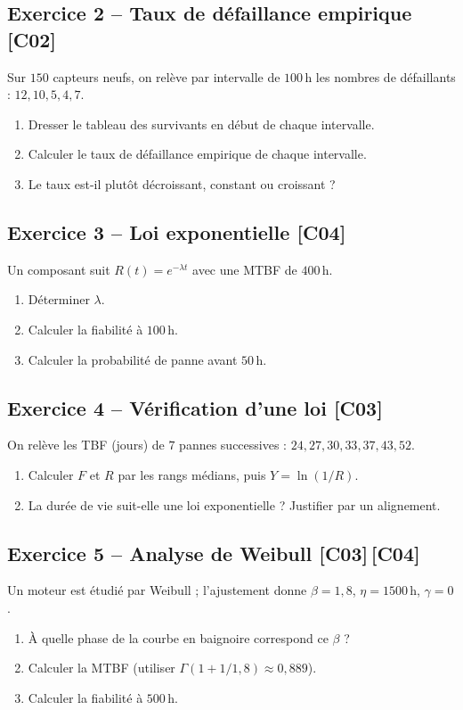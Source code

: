 \documentclass[a4paper,11pt]{article}
\begin{document}
\subsection*{Exercice 2 -- Taux de défaillance empirique \hfill {\normalsize\color{uimmred}[C02]}}
Sur $150$ capteurs neufs, on relève par intervalle de $100$\,h les nombres de défaillants : $12, 10, 5, 4, 7$.
\begin{enumerate}[label=\alph*)]
  \item Dresser le tableau des survivants en début de chaque intervalle.
  \item Calculer le taux de défaillance empirique de chaque intervalle.
  \item Le taux est-il plutôt décroissant, constant ou croissant ?
\end{enumerate}

\subsection*{Exercice 3 -- Loi exponentielle \hfill {\normalsize\color{uimmred}[C04]}}
Un composant suit $R(t) = e^{-\lambda t}$ avec une MTBF de $400$\,h.
\begin{enumerate}[label=\alph*)]
  \item Déterminer $\lambda$.
  \item Calculer la fiabilité à $100$\,h.
  \item Calculer la probabilité de panne avant $50$\,h.
\end{enumerate}

\subsection*{Exercice 4 -- Vérification d'une loi \hfill {\normalsize\color{uimmred}[C03]}}
On relève les TBF (jours) de $7$ pannes successives : $24, 27, 30, 33, 37, 43, 52$.
\begin{enumerate}[label=\alph*)]
  \item Calculer $F$ et $R$ par les rangs médians, puis $Y = \ln(1/R)$.
  \item La durée de vie suit-elle une loi exponentielle ? Justifier par un alignement.
\end{enumerate}

\subsection*{Exercice 5 -- Analyse de Weibull \hfill {\normalsize\color{uimmred}[C03]\,[C04]}}
Un moteur est étudié par Weibull ; l'ajustement donne $\beta = 1{,}8$, $\eta = 1500$\,h, $\gamma = 0$.
\begin{enumerate}[label=\alph*)]
  \item À quelle phase de la courbe en baignoire correspond ce $\beta$ ?
  \item Calculer la MTBF (utiliser $\Gamma(1 + 1/1{,}8) \approx 0{,}889$).
  \item Calculer la fiabilité à $500$\,h.
\end{enumerate}
\end{document}
